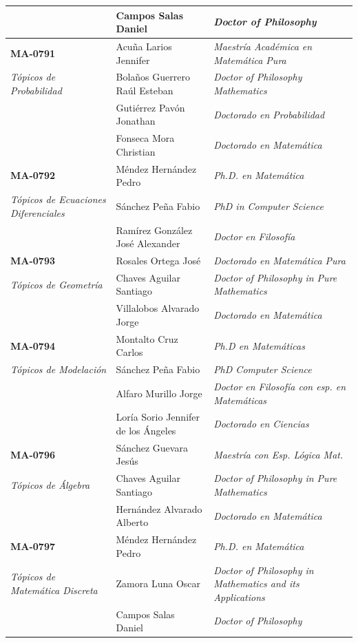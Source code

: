 \begin{landscape}
\begin{longtable}{|>{\columncolor{Celeste-UCR!12}\raggedright\arraybackslash}p{6cm}|>{\raggedright\arraybackslash}p{6.6cm}|>{\raggedright\arraybackslash}p{7.6cm}|}
 & Campos Salas Daniel & \textit{Doctor of Philosophy} \\
\hline
\textbf{MA-0791} & Acuña Larios Jennifer & \textit{Maestría Académica en Matemática Pura} \\
\textit{Tópicos de Probabilidad} & Bolaños Guerrero Raúl Esteban & \textit{Doctor of Philosophy Mathematics} \\
 & Gutiérrez Pavón Jonathan & \textit{Doctorado en Probabilidad} \\
 & Fonseca Mora Christian & \textit{Doctorado en Matemática} \\
\hline
\textbf{MA-0792} & Méndez Hernández Pedro & \textit{Ph.D. en Matemática} \\
\textit{Tópicos de Ecuaciones Diferenciales} & Sánchez Peña Fabio & \textit{PhD in Computer Science} \\
 & Ramírez González José Alexander & \textit{Doctor en Filosofía} \\
\hline
\textbf{MA-0793} & Rosales Ortega José & \textit{Doctorado en Matemática Pura} \\
\textit{Tópicos de Geometría} & Chaves Aguilar Santiago & \textit{Doctor of Philosophy in Pure Mathematics} \\
 & Villalobos Alvarado Jorge & \textit{Doctorado en Matemática} \\
\hline
\textbf{MA-0794} & Montalto Cruz Carlos & \textit{Ph.D en Matemáticas} \\
\textit{Tópicos de Modelación} & Sánchez Peña Fabio & \textit{PhD Computer Science} \\
 & Alfaro Murillo Jorge & \textit{Doctor en Filosofía con esp. en Matemáticas} \\
 & Loría Sorio Jennifer de los Ángeles & \textit{Doctorado en Ciencias} \\
\hline
\textbf{MA-0796} & Sánchez Guevara Jesús & \textit{Maestría con Esp. Lógica Mat.} \\
\textit{Tópicos de Álgebra} & Chaves Aguilar Santiago & \textit{Doctor of Philosophy in Pure Mathematics} \\
 & Hernández Alvarado Alberto & \textit{Doctorado en Matemática} \\
\hline
\textbf{MA-0797} & Méndez Hernández Pedro & \textit{Ph.D. en Matemática} \\
\textit{Tópicos de Matemática Discreta} & Zamora Luna Oscar & \textit{Doctor of Philosophy in Mathematics and its Applications} \\
 & Campos Salas Daniel & \textit{Doctor of Philosophy} \\

\end{longtable}
\end{landscape}

